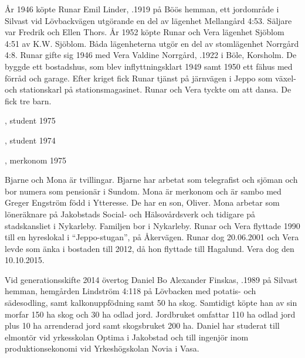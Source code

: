 År 1946 köpte Runar Emil Linder, .1919 på Böös hemman, ett jordområde i Silvast vid Lövbackvägen utgörande en del av lägenhet Mellangård	4:53. Säljare var Fredrik och Ellen Thors. År 1952 köpte Runar och Vera lägenhet Sjöblom 4:51 av K.W. Sjöblom. Båda lägenheterna utgör en del av stomlägenhet Norrgård 4:8. Runar gifte sig 1946 med Vera Valdine Norrgård, .1922 i Böle, Korsholm. De byggde ett bostadshus, som blev inflyttningsklart 1949 samt 1950 ett 	fähus med förråd och garage. Efter kriget fick Runar tjänst på järnvägen i Jeppo som växel- och stationskarl på stationsmagasinet. Runar och Vera tyckte om att dansa. De fick tre barn.
\begin{jhchildren}
  \item {}, student 1975
  \item {}, student 1974
  \item {}, merkonom 1975
\end{jhchildren}
Bjarne och Mona är tvillingar. Bjarne har arbetat som telegrafist och sjöman och bor numera som pensionär i Sundom. Mona är merkonom och är sambo med Greger Engström född i Ytteresse. De har en son, Oliver. Mona arbetar som löneräknare på Jakobstads Social- och Hälsovårdsverk och tidigare på stadskansliet i Nykarleby. Familjen bor i Nykarleby.
Runar och Vera flyttade 1990 till en hyreslokal i ``Jeppo-stugan'', på 	Åkervägen. Runar dog 20.06.2001 och Vera levde som änka i bostaden till 2012, då hon flyttade till Hagalund. Vera dog den 10.10.2015.






Vid generationsskifte 2014 övertog Daniel Bo Alexander Finskas, .1989 på Silvast hemman, hemgården Lindström 4:118 på Lövbacken med potatis- och sädesodling, samt kalkonuppfödning samt 50 ha skog. Samtidigt köpte han av sin morfar 150 ha skog och 30 ha odlad jord. Jordbruket omfattar 110 ha odlad jord plus 10 ha arrenderad jord samt skogsbruket 200 ha. Daniel har studerat till elmontör vid yrkesskolan Optima i Jakobstad och till ingenjör inom produktionsekonomi vid Yrkeshögskolan Novia i Vasa.


